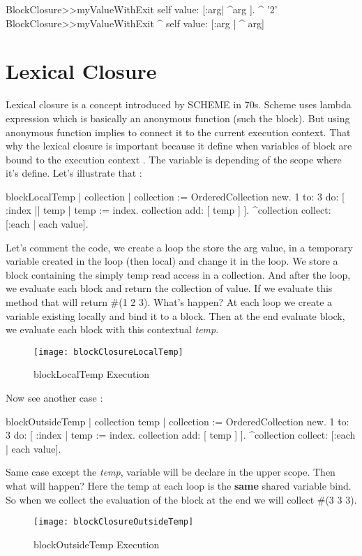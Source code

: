 \documentclass[a4paper,10pt,twoside]{book}
\begin{document}
\begin{code}{}
BlockClosure>>myValueWithExit
	      self value: [:arg| ^arg ].
      ^ '2'
BlockClosure>>myValueWithExit
 ^ self value: [:arg | ^ arg]        
\end{code}


\section{Lexical Closure}


Lexical closure is a concept introduced by SCHEME in 70s. Scheme uses lambda expression which is basically an anonymous function (such the block). But using anonymous function implies to connect it to the current execution context. That why the lexical closure is important because it define when variables of block are bound to the execution context . The variable is depending of the scope where it's  define. Let's illustrate that :

\begin{code}{}
blockLocalTemp
	| collection |
		collection := OrderedCollection new.
		1 to: 3 do: [ :index || temp |
			temp := index. 
			collection add: [ temp ] ].
		^collection collect: [:each | each value].
\end{code}

Let's  comment the code, we create a loop the store the arg value, in a temporary variable created in the loop (then local) and change it in the loop. We store a block containing the simply temp read access in a collection. And after the loop, we evaluate each block and return the collection of value.
If we evaluate this method that will return \#(1 2 3). What's happen? At each loop we create a variable existing locally and bind it to a block. Then at the end evaluate block, we evaluate each block with this contextual \emph{temp}. 

\begin{figure}[htbp]
	\centering
        \texttt{[image: blockClosureLocalTemp]}
	\caption{blockLocalTemp Execution}
	\label{fig:blockLocalTempExecution}
\end{figure}


\newpage
Now see another case : 
\begin{code}{}
blockOutsideTemp
		| collection temp |
		collection := OrderedCollection new.
		1 to: 3 do: [ :index | 
			temp := index. 
			collection add: [ temp ] ].
		^collection collect: [:each | each value].
\end{code}
Same case except the \emph{temp}, variable will be  declare in the upper scope. Then what will happen? Here the temp at each loop is the \textbf{same} shared variable bind. So when we collect the evaluation of the block at the end we will collect \#(3 3 3).
\begin{figure}[htbp]
	\centering
		\texttt{[image: blockClosureOutsideTemp]}
	\caption{blockOutsideTemp Execution}
	\label{fig:blockClosureOutsideTemp}
\end{figure}
\end{document}
